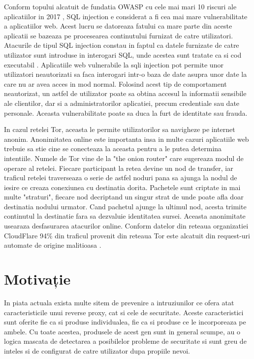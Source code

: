 Conform topului alcatuit de fundatia OWASP cu cele mai mari 10 riscuri ale aplicatiilor in 2017 \cite{owasp}, SQL injection e considerat a fi cea mai mare vulnerabilitate a aplicatiilor web. Acest lucru se datoreaza fatului ca mare parte din aceste aplicatii se bazeaza pe procesearea continutului furnizat de catre utilizatori. Atacurile de tipul SQL injection constau in faptul ca datele furnizate de catre utilizator sunt introduse in interogari SQL, unde acestea sunt tratate ca si cod executabil \cite{classification_and_countermeasures}. Aplicatiile web vulnerabile la sqli injection pot permite unor utilizatori neautorizati sa faca interogari intr-o baza de date asupra unor date la care nu ar avea acces in mod normal. Folosind acest tip de comportament neautorizat, un astfel de utilizator poate sa obtina accesul la informatii sensibile ale clientilor, dar si a administratorilor aplicatiei, precum credentiale sau date personale. Aceasta vulnerabilitate poate sa duca la furt de identitate sau frauda. 

In cazul retelei Tor, aceasta le permite utilizatorilor sa navigheze pe internet anonim. Anonimitatea online este importanta insa in multe cazuri aplicatiile web trebuie sa stie cine se conecteaza la aceasta pentru a le putea determina intentiile. Numele de Tor vine de la "the onion router" care sugereaza modul de operare al retelei. Fiecare participant la retea devine un nod de transfer, iar traficul retelei traverseaza o serie de astfel noduri pana sa ajunga la nodul de iesire ce creaza conexiunea cu destinatia dorita. Pachetele sunt criptate in mai multe "straturi", fiecare nod decriptand un singur strat de unde poate afla doar destinatia nodului urmator. Cand pachetul ajunge la ultimul nod, acesta trimite continutul la destinatie fara sa dezvaluie identitatea sursei. Aceasta anonimitate usearaza desfasurarea atacurilor online. Conform datelor din reteaua organizatiei CloudFlare 94\% din traficul provenit din reteaua Tor este alcatuit din request-uri automate de origine malitioasa \cite{tor_trouble}.


 \section{Motivație}
In piata actuala exista multe sitem de prevenire a intruziunilor ce ofera atat caracteristicile unui reverse proxy, cat si cele de securitate. Aceste caracteristici sunt oferite fie ca si produse individualea, fie ca si produse ce le incorporeaza pe ambele. Cu toate acestea, produsele de acest gen sunt in general scumpe, au o logica mascata de detectarea a posibilelor probleme de securitate si sunt greu de inteles si de configurat de catre utilizator dupa propiile nevoi.

